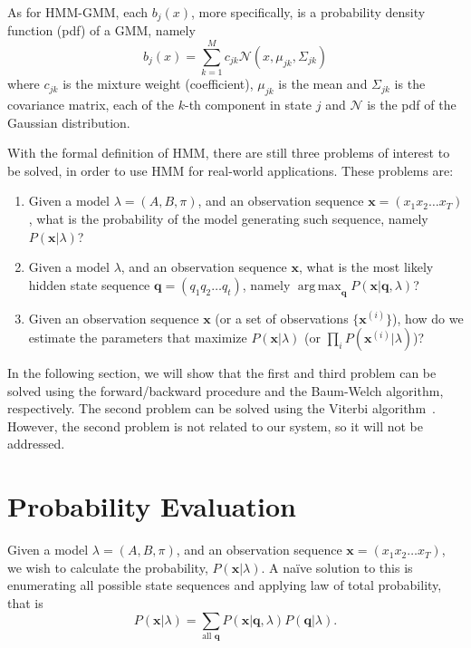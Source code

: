 \documentclass[12pt,final,twoside]{report}
\theoremstyle{plain}
\theoremstyle{definition}
\theoremstyle{remark}
\DeclareMathOperator*{\argmax}{arg\,max}
\begin{document}
As for HMM-GMM, each $b_j(x)$, more specifically, is a probability density function (pdf) of a GMM, namely
\[ b_j(x) = \sum_{k=1}^M c_{jk} \mathcal{N}(x, \mu_{jk}, \Sigma_{jk}) \]
where $c_{jk}$ is the mixture weight (coefficient), $\mu_{jk}$ is the mean and $\Sigma_{jk}$ is the covariance matrix, each of the $k$-th component in state $j$ and $\mathcal{N}$ is the pdf of the Gaussian distribution. 

With the formal definition of HMM, there are still three problems of interest to be solved, in order to use HMM for real-world applications. These problems are:
\begin{enumerate}
  \item Given a model $\lambda=(A, B, \pi)$, and an observation sequence $\mathbf{x} = (x_1 x_2 \dots x_T)$, what is the probability of the model generating such sequence, namely $P(\mathbf{x}|\lambda)$?
  \item Given a model $\lambda$, and an observation sequence $\mathbf{x}$, what is the most likely hidden state sequence $\mathbf{q} = (q_1 q_2 \dots q_t)$, namely $\argmax_{\mathbf{q}}P(\mathbf{x}|\mathbf{q},\lambda)$?
  \item Given an observation sequence $\mathbf{x}$ (or a set of observations $\{\mathbf{x}^{(i)}\}$), how do we estimate the parameters that maximize $P(\mathbf{x}|\lambda)$ (or $\prod_{i} P(\mathbf{x}^{(i)}|\lambda) $)?
\end{enumerate}

In the following section, we will show that the first and third problem can be solved using the forward/backward procedure and the Baum-Welch algorithm, respectively. The second problem can be solved using the Viterbi algorithm~\cite{forney_viterbi_1973}. However, the second problem is not related to our system, so it will not be addressed.

\section{Probability Evaluation}
Given a model $\lambda=(A, B, \pi)$, and an observation sequence $\mathbf{x} = (x_1 x_2 \dots x_T)$, we wish to calculate the probability, $P(\mathbf{x}|\lambda)$. A na\"ive solution to this is enumerating all possible state sequences and applying law of total probability, that is
\begin{equation}
  P(\mathbf{x}|\lambda) = \sum_{\text{all } \mathbf{q}} P(\mathbf{x}|\mathbf{q},\lambda) P(\mathbf{q}|\lambda) .
\end{equation}
\end{document}
